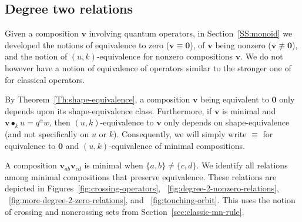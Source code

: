 \documentclass[11pt]{article}
\theoremstyle{definition}
\numberwithin{equation}{section}
\newcommand{\qv}{{\mathbf v}}
\newcommand{\bzero}{{\mathbf 0}}
\DeclareMathOperator{\kactionop}{{\scriptstyle \bullet}}
\newcommand{\kaction}[1][k]{\kactionop_{#1}}
\begin{document}
\subsection{Degree two relations}
\label{S:degreeTwo}

Given a composition $\qv$ involving quantum operators, in
Section~\ref{SS:monoid} we developed the notions of equivalence to zero
($\qv\equiv\bzero$),
of $\qv$ being nonzero ($\qv\not\equiv\bzero$),
and the notion of $(u,k)$-equivalence for nonzero compositions $\qv$.
We do not however have a notion of equivalence of operators similar to the stronger one of~\cite{BS-Monoid} for classical
operators.

By Theorem~\ref{Th:shape-equivalence}, a composition $\qv$ being equivalent to $\bzero$ only depends upon its shape-equivalence class.
Furthermore, if $\qv$ is minimal and $\qv\kaction u=q^\alpha w$, then $(u,k)$-equivalence to $\qv$ only depends on
shape-equivalence (and not specifically on $u$ or $k$).
Consequently, we will simply write $\equiv$ for equivalence to $\bzero$ and $(u,k)$-equivalence of minimal compositions.

A composition $\qv_{ab}\qv_{cd}$ is minimal when $\{a,b\}\neq\{c,d\}$.
We identify all relations among minimal compositions that preserve equivalence.
These relations are  depicted in
Figures~\ref{fig:crossing-operators},
~\ref{fig:degree-2-nonzero-relations},
~\ref{fig:more-degree-2-zero-relations},
and
~\ref{fig:touching-orbit}.
This uses the notion of crossing and noncrossing sets from Section~\ref{sec:classic-mn-rule}.
\end{document}
